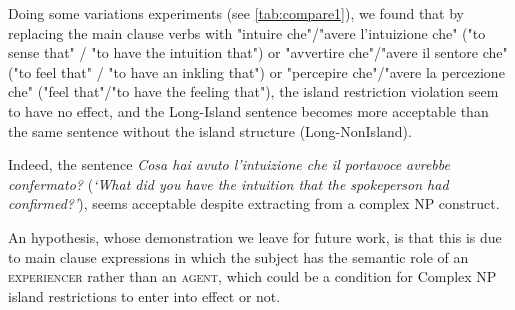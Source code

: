 Doing some variations experiments (see  \autoref{tab:compare1}), we found that by replacing the main clause verbs with "intuire che"/"avere l'intuizione che" ("to sense that" / "to have the intuition that") or "avvertire che"/"avere il sentore che" ("to feel that" / "to have an inkling that") or "percepire che"/"avere la percezione che" ("feel that"/"to have the feeling that"), the island restriction violation seem to have no effect, and the Long-Island sentence becomes more acceptable than the same sentence without the island structure (Long-NonIsland).
 
Indeed, the sentence \textit{Cosa hai avuto l'intuizione che il portavoce avrebbe confermato?} (\textit{`What did you have the intuition that the spokeperson had confirmed?'}), seems acceptable despite extracting from a complex NP construct. 

An hypothesis, whose demonstration we leave for future work, is that this is due to main clause expressions in which the subject has the semantic role of an \textsc{experiencer} rather than an \textsc{agent}, which could be a condition for Complex NP island restrictions to enter into effect or not. 

